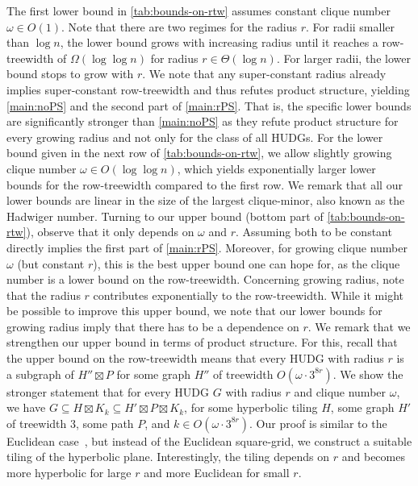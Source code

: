 \documentclass[11pt]{article}
\begin{document}
%
The first lower bound in \cref{tab:bounds-on-rtw} assumes constant clique number $\omega \in O(1)$.
Note that there are two regimes for the radius $r$.
For radii smaller than $\log n$, the lower bound grows with increasing radius until it reaches a row-treewidth of $\Omega(\log\log n)$ for radius $r \in \Theta(\log n)$.
For larger radii, the lower bound stops to grow with $ r $.
We note that any super-constant radius already implies super-constant row-treewidth and thus refutes product structure, yielding \cref{main:noPS} and the second part of \cref{main:rPS}.
That is, the specific lower bounds are significantly stronger than \cref{main:noPS} as they refute product structure for every growing radius and not only for the class of all HUDGs.
%
For the lower bound given in the next row of \cref{tab:bounds-on-rtw}, we allow slightly growing clique number $\omega \in O(\log \log n)$, which yields exponentially larger lower bounds for the row-treewidth compared to the first row.
We remark that all our lower bounds are linear in the size of the largest clique-minor, also known as the Hadwiger number.
%
Turning to our upper bound (bottom part of \cref{tab:bounds-on-rtw}), observe that it only depends on $\omega$ and $r$.
Assuming both to be constant directly implies the first part of \cref{main:rPS}.
Moreover, for growing clique number $\omega$ (but constant $r$), this is the best upper bound one can hope for, as the clique number is a lower bound on the row-treewidth.
Concerning growing radius, note that the radius $r$ contributes exponentially to the row-treewidth.
While it might be possible to improve this upper bound, we note that our lower bounds for growing radius imply that there has to be a dependence on $r$.
We remark that we strengthen our upper bound in terms of product structure.
For this, recall that the upper bound on the row-treewidth means that every HUDG with radius $ r $ is a subgraph of $ H'' \boxtimes P $ for some graph $ H'' $ of treewidth $ O(\omega \cdot 3^{8r}) $.
We show the stronger statement that for every HUDG $ G $ with radius $r$ and clique number $\omega$, we have $G \subseteq H \boxtimes K_k \subseteq H' \boxtimes P \boxtimes K_{k}$, for some hyperbolic tiling $ H $, some graph $H'$ of treewidth $3$, some path $P$, and $k \in O(\omega \cdot 3^{8r})$.
Our proof is similar to the Euclidean case~\cite{dvorak_notes_2021}, but instead of the Euclidean square-grid, we construct a suitable tiling of the hyperbolic plane.
Interestingly, the tiling depends on $r$ and becomes more hyperbolic for large $ r $ and more Euclidean for small $ r $.
\end{document}
